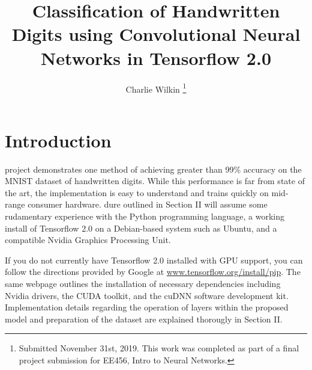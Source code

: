 \documentclass[transmag, onecolumn]{IEEEtran}
\begin{document}
\title{Classification of Handwritten Digits using Convolutional Neural Networks
in Tensorflow 2.0}

\author{Charlie Wilkin
\thanks{Submitted November 31st, 2019. This work was completed as part of a 
final project submission for EE456, Intro to Neural Networks.}}


\maketitle

\section{Introduction}

 project demonstrates one method of achieving greater than
99\% accuracy on the MNIST dataset of handwritten digits. While this
performance is far from state of the art, the implementation is easy to
understand and trains quickly on mid-range consumer hardware.  
dure outlined in Section II will assume some rudamentary experience with the
Python programming language, a working install of Tensorflow 2.0 on
a Debian-based system such as Ubuntu, and a compatible Nvidia Graphics
Processing Unit. 

If you do not currently have Tensorflow 2.0 installed with GPU support, you
can follow the directions provided by Google at 
\href{https://www.tensorflow.org/install/gpu}{www.tensorflow.org/install/pip}.
The same webpage outlines the installation of necessary dependencies including
Nvidia drivers, the CUDA toolkit, and the cuDNN software development kit. 
Implementation details regarding the operation of layers within the proposed
model and preparation of the dataset are explained thorougly in Section II.
\end{document}
